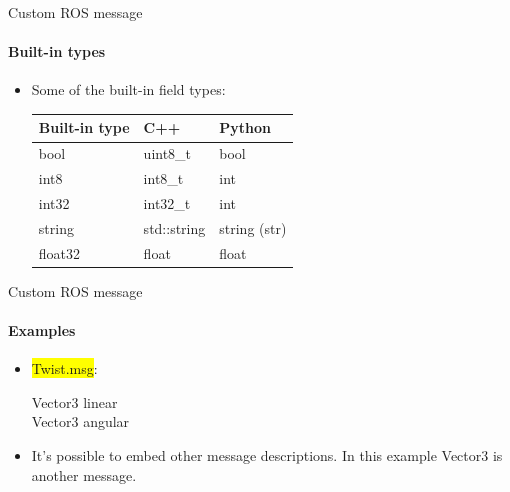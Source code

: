 \documentclass{beamer}
\begin{document}
\begin{frame}{Custom ROS message}
    \framesubtitle{Built-in types}  
    
    \begin{itemize}
        \item Some of the built-in field types:

        \begin{table}[!b]
            \begin{tabularx}{\textwidth}{XXX}
                \textbf{Built-in type} & \textbf{C++} &\textbf{Python}  \\
                \toprule
                   bool & uint8\_t & bool  \\
                   
                   int8 &    int8\_t &  int\\
                   
                   int32 & int32\_t &  int\\
                   
                   string & std::string & string (str) \\
                   
                   float32 & float & float\\

                \bottomrule
            \end{tabularx}%
        \end{table}

    \end{itemize}
\end{frame}

\begin{frame}{Custom ROS message}
    \framesubtitle{Examples}  
    
    \begin{itemize}
        \item {\ttfamily \colorbox{yellow}{Twist.msg}}:

    \begin{focus}
        \ttfamily
        Vector3  linear\\
        Vector3  angular
    \end{focus}
    
    
    \item It's possible to embed other message descriptions. In this example {\ttfamily \colorbox{gray!30!white}{Vector3}} is another message.
    \end{itemize}
    

\end{frame}
\end{document}
